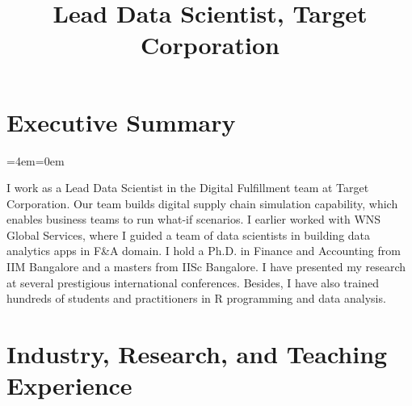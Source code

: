 \documentclass[11pt,a4paper,]{moderncv}
\title{Lead Data Scientist, Target Corporation}
\begin{document}
\makecvtitle



\newenvironment{smallblockquote}{%
  \par%
  \medskip
  \leftskip=2em\rightskip=0em%
  \noindent\ignorespaces}{%
  \par\medskip}

\newenvironment{blockquote}{%
  \par%
  \medskip
  \leftskip=4em\rightskip=0em%
  \noindent\ignorespaces}{%
  \par\medskip}

\hypertarget{executive-summary}{%
\section{Executive Summary}\label{executive-summary}}

\begingroup
%
  \par%
  \medskip
  \leftskip=4em\rightskip=0em%
  \noindent\ignorespaces

I work as a Lead Data Scientist in the Digital Fulfillment team at Target Corporation. Our team builds digital supply chain simulation capability, which enables business teams to run what-if scenarios. I earlier worked with WNS Global Services, where I guided a team of data scientists in building data analytics apps in F\&A domain. I hold a Ph.D. in Finance and Accounting from IIM Bangalore and a masters from IISc Bangalore. I have presented my research at several prestigious international conferences. Besides, I have also trained hundreds of students and practitioners in R programming and data analysis.

%
  \par\medskip
\endgroup

\hypertarget{industry-research-and-teaching-experience}{%
\section{Industry, Research, and Teaching
Experience}\label{industry-research-and-teaching-experience}}
\end{document}
